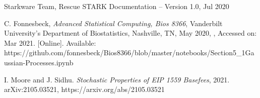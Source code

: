 \documentclass[peerreview]{ieeesyscoin}
\begin{document}
\begin{thebibliography}{00}
  Starkware Team, Rescue STARK Documentation – Version 1.0, Jul 2020

 C. Fonnesbeck, \textit{Advanced Statistical Computing, Bios 8366}, Vanderbilt University's Department of Biostatistics, Nashville, TN, May 2020, , Accessed on: Mar 2021.  [Online]. Available:  https://github.com/fonnesbeck/Bios8366/blob/master/notebooks/Section5\_1\-Gaussian-Processes.ipynb

  I. Moore and J. Sidhu. \textit{Stochastic Properties of EIP 1559 Basefees}, 2021. arXiv:2105.03521,  https://arxiv.org/abs/2105.03521



\end{thebibliography}


\EOD
\end{document}
